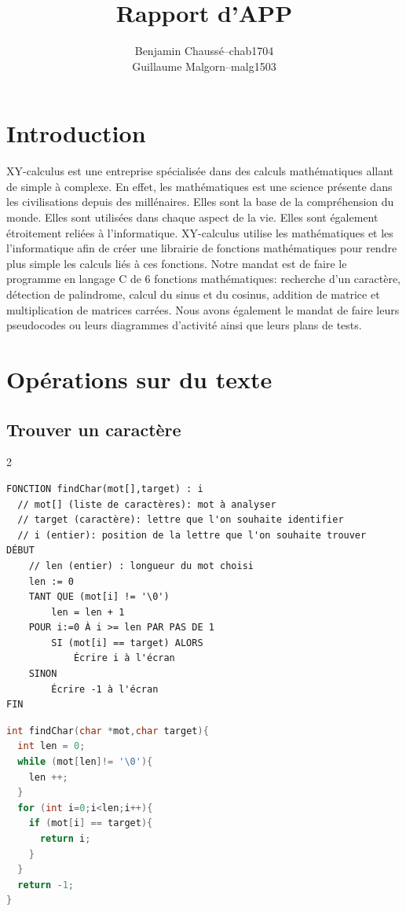 \documentclass[a11paper, 11pt]{article}
\title{Rapport d'APP}
\author{
  \addtolength{\tabcolsep}{-0.4em}
  \begin{tabular}{rcl} %
  Benjamin Chaussé     & -- & chab1704 \\
  Guillaume Malgorn    & -- & malg1503 \\
  \end{tabular}
}
\begin{document}
\maketitle
\tableofcontents
\newpage

\section{Introduction}

XY-calculus est une entreprise spécialisée dans des calculs mathématiques
allant de simple à complexe. En effet, les mathématiques est une science
présente dans les civilisations depuis des millénaires. Elles sont la
base de la compréhension du monde. Elles sont utilisées dans chaque
aspect de la vie. Elles sont également étroitement reliées à
l’informatique. XY-calculus utilise les mathématiques et les
l’informatique afin de créer une librairie de fonctions mathématiques
pour rendre plus simple les calculs liés à ces fonctions. Notre mandat
est de faire le programme en langage C de 6 fonctions mathématiques:
recherche d’un caractère, détection de palindrome, calcul du sinus et du
cosinus, addition de matrice et multiplication de matrices carrées. Nous
avons également le mandat de faire leurs pseudocodes ou leurs diagrammes
d’activité ainsi que leurs plans de tests.

\section{Opérations sur du texte}
\subsection{Trouver un caractère}

\begin{multicols}{2}

\begin{lstlisting}[caption=Pseudocode de la fonction findChar]
FONCTION findChar(mot[],target) : i
  // mot[] (liste de caractères): mot à analyser
  // target (caractère): lettre que l'on souhaite identifier
  // i (entier): position de la lettre que l'on souhaite trouver
DÉBUT
    // len (entier) : longueur du mot choisi
    len := 0
    TANT QUE (mot[i] != '\0')
        len = len + 1
    POUR i:=0 À i >= len PAR PAS DE 1
        SI (mot[i] == target) ALORS
            Écrire i à l'écran
    SINON
        Écrire -1 à l'écran
FIN
\end{lstlisting}


\columnbreak

\begin{lstlisting}[language=C,caption=Fonction findChar écrite en C]
int findChar(char *mot,char target){
  int len = 0;
  while (mot[len]!= '\0'){
    len ++;
  }
  for (int i=0;i<len;i++){
    if (mot[i] == target){
      return i;
    }
  }
  return -1;
}
\end{lstlisting}

\end{multicols}
\end{document}
